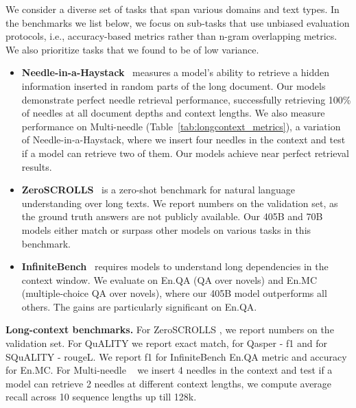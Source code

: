 We consider a diverse set of tasks that span various domains and text types. In the benchmarks we list below, we focus on sub-tasks that use unbiased evaluation protocols, i.e., accuracy-based metrics rather than n-gram overlapping metrics. We also prioritize tasks that we found to be of low variance.  %
\begin{itemize}
    \item \textbf{Needle-in-a-Haystack}~\citep{niah}
    measures a model’s ability to retrieve a hidden information inserted in random parts of the long document. Our \llamathree models demonstrate perfect needle retrieval performance, successfully retrieving 100\% of needles at all document depths and context lengths. We also measure performance on Multi-needle (Table~\ref{tab:longcontext_metrics}), a variation of Needle-in-a-Haystack, where we insert four needles in the context and test if a model can retrieve two of them. Our \llamathree models achieve near perfect retrieval results.
    \item \textbf{ZeroSCROLLS}~\citep{zeroscrolls} is a zero-shot benchmark for natural language understanding over long texts. We report numbers on the validation set, as the ground truth answers are not publicly available. Our \llamathree 405B and 70B models either match or surpass other models on various tasks in this benchmark.
    \item \textbf{InfiniteBench}~\citep{zhang2024infty} requires models to understand long dependencies in the context window. We evaluate \llamathree on En.QA (QA over novels) and En.MC (multiple-choice QA over novels), where our 405B model outperforms all others. The gains are particularly significant on En.QA.
\end{itemize}

\begin{table}[t]
  \center
  
  \caption{\label{tab:longcontext_metrics} \textbf{Long-context benchmarks.} For ZeroSCROLLS \citep{zeroscrolls}, we report numbers on the validation set.  For QuALITY we report exact match, for Qasper - f1 and for SQuALITY - rougeL. We report f1 for InfiniteBench \citep{zhang2024infty} En.QA metric and accuracy for En.MC. For Multi-needle ~\citep{niah} we insert 4 needles in the context and test if a model can retrieve 2 needles at different context lengths, we compute average recall across 10 sequence lengths up till 128k.}
\end{table}



